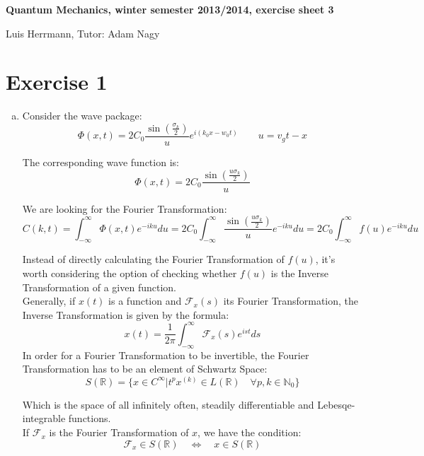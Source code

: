 \documentclass[a4paper,german,12pt,smallheadings]{scrartcl}
\begin{document}
\begin{center}
\bfseries %
\sffamily %
\vspace{-40pt}
Quantum Mechanics, winter semester 2013/2014, exercise sheet 3

Luis Herrmann, Tutor: Adam Nagy
\vspace{-10pt}
\end{center}

\section*{Exercise 1}

\begin{enumerate}[a)]
\item Consider the wave package:
\begin{equation*}
\Phi(x,t)=2C_0\frac{\sin(\frac{\sigma_k}{2})}{u}e^{i(k_0x-w_0t)}\quad \quad u=v_gt-x
\end{equation*}

The corresponding wave function is:
\begin{equation*}
\Phi(x,t)=2C_0\frac{\sin(\frac{u\sigma_k}{2})}{u}
\end{equation*}

We are looking for the Fourier Transformation:
\begin{equation*}
C(k,t)=\int_{-\infty}^{\infty}\Phi(x,t)e^{-iku}du=2C_0\int_{-\infty}^{\infty}\frac{\sin(\frac{u\sigma_k}{2})}{u}e^{-iku}du=2C_0\int_{-\infty}^{\infty}f(u)e^{-iku}du
\end{equation*}

Instead of directly calculating the Fourier Transformation of $f(u)$, it's worth considering the option of checking whether $f(u)$ is the Inverse Transformation of a given function.\\ Generally, if $x(t)$ is a function and $\mathcal{F}_x(s)$ its Fourier Transformation, the Inverse Transformation is given by the formula:
\begin{equation*}
x(t)=\frac{1}{2\pi}\int_{-\infty}^{\infty}\mathcal{F}_x(s)e^{ist}ds
\end{equation*}
In order for a Fourier Transformation to be invertible, the Fourier Transformation has to be an element of Schwartz Space:
\begin{equation*}
S(\mathbb{R})=\{x\in C^{\infty} | t^p x^{(k)} \in L(\mathbb{R}) \quad \forall p,k\in \mathbb{N}_0\}
\end{equation*}

Which is the space of all infinitely often, steadily differentiable and Lebesqe-integrable functions.\\
If $\mathcal{F}_x$ is the Fourier Transformation of $x$, we have the condition: 
\begin{equation*}
\mathcal{F}_x\in S(\mathbb{R}) \quad \Leftrightarrow \quad x\in S(\mathbb{R})
\end{equation*}


\end{enumerate}
\end{document}
